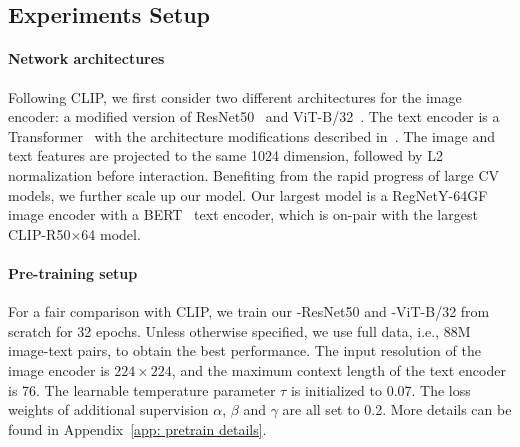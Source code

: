 



\subsection{Experiments Setup}\label{Training Setup}

\paragraph{Network architectures} Following CLIP, we first consider two different architectures for the image encoder: a modified version of ResNet50~\citep{radford2021learning} and ViT-B/32~\citep{dosovitskiy2020image}. The text encoder is a Transformer~\citep{vaswani2017attention} with the architecture modifications described in~\citet{radford2019language}. The image and text features are projected to the same 1024 dimension, followed by L2 normalization before interaction. Benefiting from the rapid progress of large CV models, we further scale up our model. Our largest model is a RegNetY-64GF~\citep{radosavovic2020designing,goyal2021self} image encoder with a BERT~\citep{devlin2018bert} text encoder, which is on-pair with the largest CLIP-R50$\times$64 model.

\paragraph{Pre-training setup}
\label{sec:pre-training setup}
For a fair comparison with CLIP, we train our \workname-ResNet50 and \workname-ViT-B/32 from scratch for 32 epochs. Unless otherwise specified, we use full data, i.e., 88M image-text pairs, to obtain the best performance. The input resolution of the image encoder is $224\times224$, and the maximum context length of the text encoder is 76. 
The learnable temperature parameter $\tau$ is initialized to 0.07. The loss weights of additional supervision ${\alpha}$, ${\beta}$ and ${\gamma}$ are all set to 0.2.
More details can be found in Appendix~\ref{app: pretrain details}.

